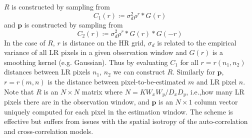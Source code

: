 %
\(R\) is constructed by sampling from
\begin{equation}
	C_1(r) \coloneqq \sigma_{d}^2 \rho^{r} \ast G(r)
\end{equation}
and \(\bm{p}\) is constructed by sampling from
\begin{equation}
	C_2(r) \coloneqq \sigma_d^2 \rho^{r} \ast G(r) \ast G(-r)
\end{equation}
In the case of \(R\), \(r\) is distance on the HR grid, \(\sigma_d\) is related to the empirical variance of all LR pixels in a given observation window and \(G(r)\) is a smoothing kernel (e.g. Gaussian).
%
Thus by evaluating \(C_1\) for all \(r = r(n_1, n_2)\) distances between LR pixels \(n_1\), \(n_2\) we can construct \(R\).
%
Similarly for \(\bm{p}\), \(r = r(m, n)\) is the distance between pixel-to-be-estimated \(m\) and LR pixel \(n\).
%
Note that \(R\) is an \(N \times N\) matrix where \(N = K W_x W_y/D_x D_y\), i.e.,how many LR pixels there are in the observation window, and \(\bm{p}\) is an \(N \times 1\) column vector uniquely computed for each pixel in the estimation window.
%
The scheme is effective but suffers from issues with the spatial isotropy of the auto-correlation and cross-correlation models.
